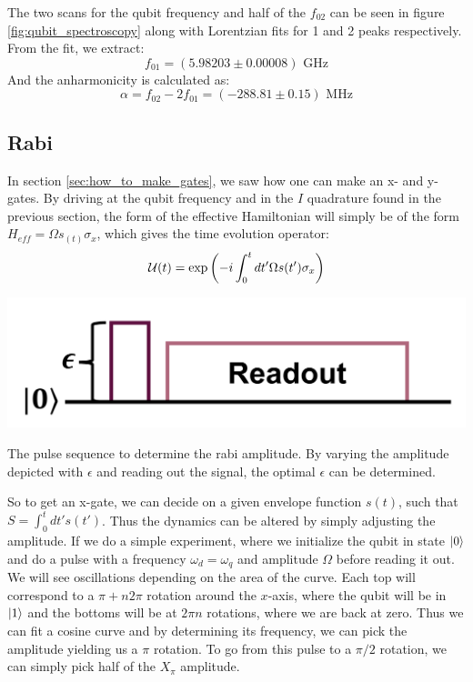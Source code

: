 The two scans for the qubit frequency and half of the $f_{02}$ can be seen in figure \ref{fig:qubit_spectroscopy} along with Lorentzian fits for 1 and 2 peaks respectively. From the fit, we extract:
\begin{equation}
    f_{01} = (5.98203 \pm 0.00008) \text{ GHz}
\end{equation}
And the anharmonicity is calculated as:
\begin{equation}
    \alpha = f_{02} - 2f_{01} = (-288.81 \pm 0.15) \text{ MHz}
\end{equation}


\subsection{Rabi}
In section \ref{sec:how_to_make_gates}, we saw how one can make an x- and y-gates. By driving at the qubit frequency and in the $I$ quadrature found in the previous section, the form of the effective Hamiltonian will simply be of the form $H_{eff} = \Omega s_(t) \sigma_x$, which gives the time evolution operator:
\begin{equation}
    \mathcal{U}(t) = \exp\left(-i\int_0^t dt' \Omega s(t') \sigma_x \right)
\end{equation}
\begin{marginfigure}[5 cm]
    \centering
    \includegraphics[]{Figs/circuits/rabi.png}
    \caption{The pulse sequence to determine the rabi amplitude. By varying the amplitude depicted with $\epsilon$ and reading out the signal, the optimal $\epsilon$ can be determined.}
    \label{fig:enter-label}
\end{marginfigure}
So to get an x-gate, we can decide on a given envelope function $s(t)$, such that $S = \int_0^t  dt' s(t')$. Thus the dynamics can be altered by simply adjusting the amplitude. If we do a simple experiment, where we initialize the qubit in state $\ket{0}$ and do a pulse with a frequency $\omega_d = \omega_q$ and amplitude $\Omega$ before reading it out. We will see oscillations depending on the area of the curve. Each top will correspond to a $\pi +n2\pi$ rotation around the $x$-axis, where the qubit will be in $\ket{1}$ and the bottoms will be at $2\pi n$ rotations, where we are back at zero. Thus we can fit a cosine curve and by determining its frequency, we can pick the amplitude yielding us a $\pi$ rotation. To go from this pulse to a $\pi/2$ rotation, we can simply pick half of the $X_{\pi}$ amplitude.

